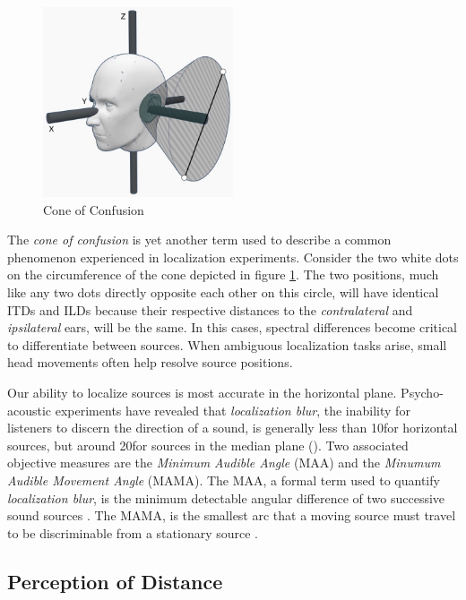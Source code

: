 \begin{figure}[ht!]%
\centering
\includegraphics[width=0.5\textwidth]{img/cone_confusion.JPG}
\caption{Cone of Confusion}
\label{fig:cone-confusion}
\end{figure}

The \textit{cone of confusion} is yet another term used to describe a common phenomenon experienced in localization experiments. Consider the two white dots on the circumference of the cone depicted in figure \ref{fig:cone-confusion}. The two positions, much like any two dots directly opposite each other on this circle, will have identical ITDs and ILDs because their respective distances to the \textit{contralateral} and \textit{ipsilateral} ears, will be the same. In this cases, spectral differences become critical to differentiate between sources. When ambiguous localization tasks arise, small head movements often help resolve source positions.

Our ability to localize sources is most accurate in the horizontal plane. Psycho-acoustic experiments have revealed that \textit{localization blur}, the inability for listeners to discern the direction of a sound, is generally less than 10\textdegree for horizontal sources, but around 20\textdegree for sources in the median plane (\cite{hacihabiboglu2017perceptual}). Two associated objective measures are the \textit{Minimum Audible Angle} (MAA) and the \textit{Minumum Audible Movement Angle} (MAMA). The MAA, a formal term used to quantify \textit{localization blur}, is the minimum detectable angular difference of two successive sound sources \cite{reardon2017evaluation}. The MAMA, is the smallest arc that a moving source must travel to be discriminable from a stationary source \cite{moore1995hearing}.

\subsection{Perception of Distance}

